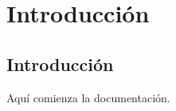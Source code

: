 \chapter{Introducción} \label{introudcción}


\section{Introducción}

Aquí comienza la documentación.